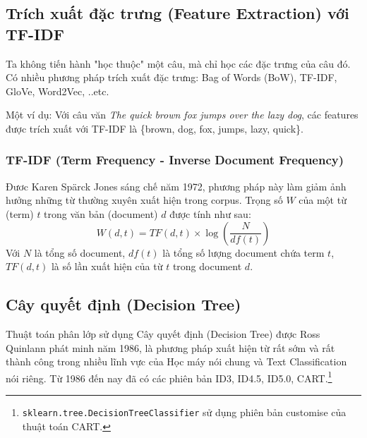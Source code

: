 \documentclass[12pt]{article}
\begin{document}
\subsection{Trích xuất đặc trưng (Feature Extraction) với TF-IDF}
Ta không tiến hành "học thuộc" một câu, mà chỉ học các đặc trưng của câu đó. Có nhiều phương pháp trích xuất đặc trưng: Bag of Words (BoW), TF-IDF, GloVe, Word2Vec, ..etc.

Một ví dụ: Với câu văn \textit{The quick brown fox jumps over the lazy dog}, các features được trích xuất với TF-IDF là \{brown, dog, fox, jumps, lazy, quick\}.
\subsubsection{TF-IDF (Term Frequency - Inverse Document Frequency)}
Đươc Karen Spärck Jones sáng chế năm 1972\cite{Jones72astatistical}, phương pháp này làm giảm ảnh hưởng những từ thường xuyên xuất hiện trong corpus. Trọng số $W$ của một từ (term) $t$ trong văn bản (document) $d$ được tính như sau:
$$
W(d, t) = TF(d, t) \times \log\left(\frac{N}{df(t)}\right)
$$
Với $N$ là tổng số document, $df(t)$ là tổng số lượng document chứa term $t$, $TF(d, t)$ là số lần xuất hiện của từ $t$ trong document $d$.

\subsection{Cây quyết định (Decision Tree)}
Thuật toán phân lớp sử dụng Cây quyết định (Decision Tree) được Ross Quinlann phát minh năm 1986\cite{DBLP:journals/ml/Quinlan86}, là phương pháp xuất hiện từ rất sớm và rất thành công trong nhiều lĩnh vực của Học máy nói chung và Text Classification nói riêng. Từ 1986 đến nay đã có các phiên bản ID3, ID4.5, ID5.0, CART.\footnote{\texttt{sklearn.tree.DecisionTreeClassifier} sử dụng phiên bản customise của thuật toán CART.\cite{scikit-learn}}
\end{document}
